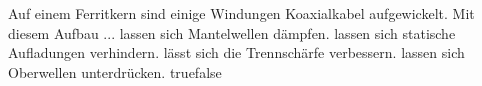     {Auf einem Ferritkern sind einige Windungen Koaxialkabel aufgewickelt. Mit diesem Aufbau ...}
    {lassen sich Mantelwellen dämpfen.}
    {lassen sich statische Aufladungen verhindern.}
    {lässt sich die Trennschärfe verbessern.}
    {lassen sich Oberwellen unterdrücken.}
    {true}{false}